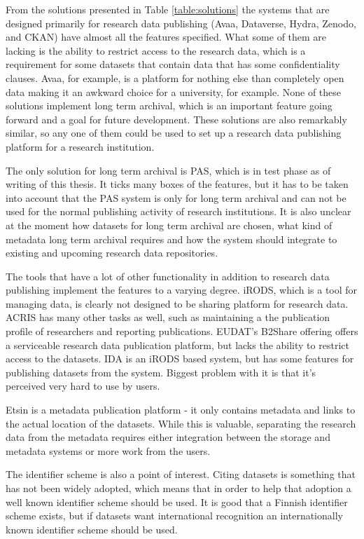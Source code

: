 From the solutions presented in Table \ref{table:solutions} the systems that
are designed primarily for research data publishing (Avaa, Dataverse, Hydra,
Zenodo, and CKAN) have almost all the features specified. What some of
them are lacking is the ability to restrict access to the research data, which
is a requirement for some datasets that contain data that has some
confidentiality clauses. Avaa, for example, is a platform for nothing else than
completely open data making it an awkward choice for a university, for example.
None of these solutions implement long term archival,
which is an important feature going forward and a goal for future development.
These solutions are also remarkably similar, so any one of them could be used
to set up a research data publishing platform for a research institution.

The only solution for long term archival is PAS, which is in test phase as of
writing of this thesis. It ticks many boxes of the features, but it has to be
taken into account that the PAS system is only for long term archival and
can not be used for the normal publishing activity of research institutions.
It is also unclear at the moment how datasets for long term archival are
chosen, what kind of metadata long term archival requires and how the system
should integrate to existing and upcoming research data repositories.

The tools that have a lot of other functionality in addition to research data
publishing implement the features to a varying degree. iRODS, which is a tool
for managing data, is clearly not designed to be sharing platform for
research data. ACRIS has many other tasks as well, such as maintaining a the
publication profile of researchers and reporting publications. EUDAT's B2Share
offering offers a serviceable research data publication platform, but lacks the
ability to restrict access to the datasets. IDA is an iRODS based system, but
has some features for publishing datasets from the system. Biggest problem with
it is that it's perceived very hard to use by users.

Etsin is a metadata publication platform - it only contains metadata and links
to the actual location of the datasets. While this is valuable, separating the
research data from the metadata requires either integration between the storage
and metadata systems or more work from the users.

The identifier scheme is also a point of interest. Citing datasets is something
that has not been widely adopted, which means that in order to help that
adoption a well known identifier scheme should be used. It is good that
a Finnish identifier scheme exists, but if datasets want international recognition
an internationally known identifier scheme should be used.

